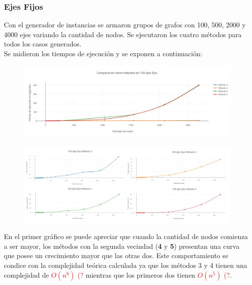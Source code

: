 \subsubsection*{Ejes Fijos}

Con el generador de instancias se armaron grupos de grafos con 100, 500, 2000 y 4000 ejes variando la cantidad de nodos. Se ejecutaron los cuatro m\'etodos para todos los casos generados.\\

Se midieron los tiempos de ejecuci\'on y se exponen a continuaci\'on:

  \begin{figure}[h!]
   \begin{center}
 	\includegraphics[scale=0.55]{imagenes/local/tiempos/100ejes.png}
   \end{center}
 \end{figure}
 
  \begin{figure}[h!]
   \begin{center}
 	\includegraphics[scale=0.08]{imagenes/local/tiempos/100ejes2.png}
   \end{center}
 \end{figure}

  \newpage  
 
En el primer gr\'afico se puede apreciar que cuando la cantidad de nodos comienza a ser mayor, los m\'etodos con la segunda vecindad (\textbf{4} y \textbf{5}) presentan una curva que posee un crecimiento mayor que las otras dos. Este comportamiento se condice con la complejidad te\'orica calculada ya que los m\'etodos 3 y 4 tienen una complejidad de \textcolor{red}{$O(n^6)$ (?} mientras que los primeros dos tienen \textcolor{red}{$O(n^5)$ (?}.\\


